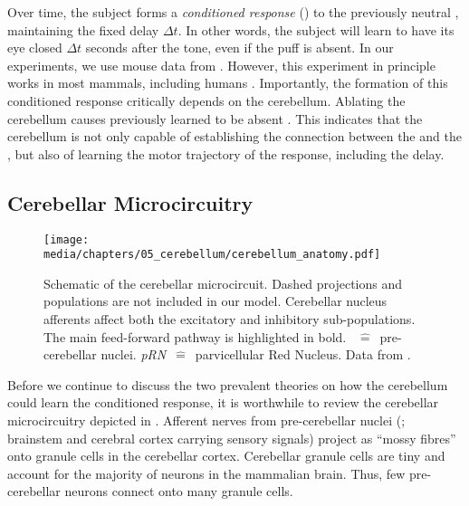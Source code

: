 Over time, the subject forms a \emph{conditioned response} (\CR) to the previously neutral \CS, maintaining the fixed delay $\Delta t$. In other words, the subject will learn to have its eye closed $\Delta t$ seconds after the tone, even if the puff is absent.
In our experiments, we use mouse data from \citet{heiney2014cerebellardependent}.
However, this experiment in principle works in most mammals, including humans \citep{cheng2008neural}.
Importantly, the formation of this conditioned response critically depends on the cerebellum.
Ablating the cerebellum causes previously learned \CRpl to be absent \citep{mccormick1981engram}.
This indicates that the cerebellum is not only capable of establishing the connection between the \CS and the \UR, but also of learning the motor trajectory of the response, including the delay.

\subsection{Cerebellar Microcircuitry}
\label{sec:cerebellum_microcircuit}

\begin{figure}[t]
	\centering
	\texttt{[image: media/chapters/05\_cerebellum/cerebellum\_anatomy.pdf]}
	\caption[Schematic of the cerebellar microcircuit.]{Schematic of the cerebellar microcircuit. Dashed projections and populations are not included in our model. Cerebellar nucleus afferents affect both the excitatory and inhibitory sub-populations.  The main feed-forward pathway is highlighted in bold. \emph{\PCN}~$\hat=$~pre-cerebellar nuclei. \emph{pRN}~$\hat=$~parvicellular Red Nucleus. Data from \citet{ito2010cerebellar,llinas2010olivocerebellar}.}
	\vspace*{-0.5em}
	\label{fig:cerebellum_anatomy}
\end{figure}

Before we continue to discuss the two prevalent theories on how the cerebellum could learn the conditioned response, it is worthwhile to review the cerebellar microcircuitry depicted in .
Afferent nerves from pre-cerebellar nuclei (\PCN; brainstem and cerebral cortex carrying sensory signals) project as \enquote{mossy fibres} onto granule cells in the cerebellar cortex.
Cerebellar granule cells are tiny and account for the majority of neurons in the mammalian brain.
Thus, few pre-cerebellar neurons connect onto many granule cells.

